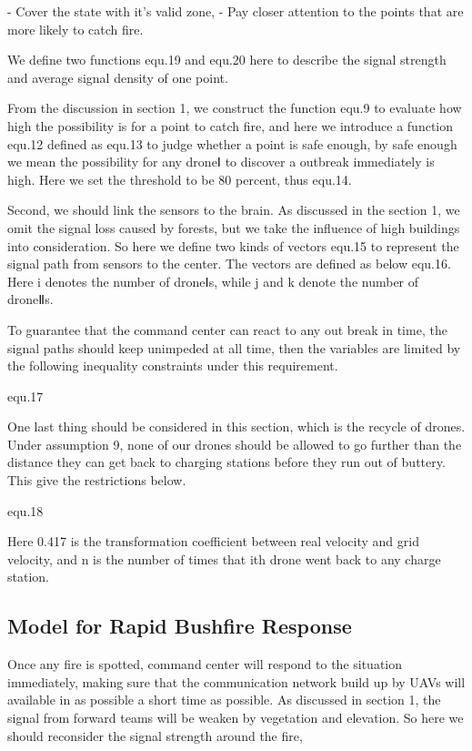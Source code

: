 \documentclass[13pt]{ctexart} %
\begin{document}
- Cover the state with it’s valid zone,
- Pay closer attention to the points that are more likely to catch fire.

We define two functions {equ.19} and {equ.20} here to describe the signal strength and average signal density of one point.

From the discussion in section 1, we construct the function {equ.9} to evaluate how high the possibility is for a point to catch fire, and here we introduce a function {equ.12} defined as {equ.13} to judge whether a point is safe enough, by safe enough we mean the possibility for any droneⅠ to discover a outbreak immediately is high. Here we set the threshold to be 80 percent, thus {equ.14}.

Second, we should link the sensors to the brain. As discussed in the section 1, we omit the signal loss caused by forests, but we take the influence of high buildings into consideration. So here we define two kinds of vectors {equ.15} to represent the signal path from sensors to the center. The vectors are defined as below {equ.16}. Here i denotes the number of droneⅠs, while j and k denote the number of droneⅡs.

To guarantee that the command center can react to any out break in time, the signal paths should keep unimpeded at all time, then the variables are limited by the following inequality constraints under this requirement.

    {equ.17}

One last thing should be considered in this section, which is the recycle of drones. Under assumption 9, none of our drones should be allowed to go further than the distance they can get back to charging stations before they run out of buttery. This give the restrictions below.

    {equ.18}

Here 0.417 is the transformation coefficient between real velocity and grid velocity, and n is the number of times that ith drone went back to any charge station.


\subsection{Model for Rapid Bushfire Response}
Once any fire is spotted, command center will respond to the situation immediately, making sure that the communication network build up by UAVs will available in as possible a short time as possible. As discussed in section 1, the signal from forward teams will be weaken by vegetation and elevation. So here we should reconsider the signal strength around the fire,
\end{document}

